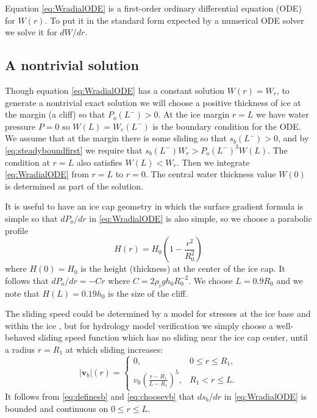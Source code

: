 \documentclass[gmd]{copernicus}   %
\newcommand\bv{\mathbf{v}}
\begin{document}
Equation \eqref{eq:WradialODE} is a first-order ordinary differential equation (ODE) for $W(r)$.  To put it in the standard form expected by a numerical ODE solver we solve it for $dW/dr$.

\subsection{A nontrivial solution}  \label{subsect:exactsoln}  Though equation \eqref{eq:WradialODE} has a constant solution $W(r)=W_r$, to generate a nontrivial exact solution we will choose a positive thickness of ice at the margin (a cliff) so that $P_o(L^-)>0$.  At the ice margin $r=L$ we have water pressure $P=0$ so $W(L)=W_c(L^-)$ is the boundary condition for the ODE.  We assume that at the margin there is some sliding so that $s_b(L^-)>0$, and by \eqref{eq:steadyboundfirst} we require that $s_b(L^-) W_r > P_o(L^-)^3 W(L)$.  The condition at $r=L$ also satisfies $W(L) < W_r$.  Then we integrate \eqref{eq:WradialODE} from $r=L$ to $r=0$.  The central water thickness value $W(0)$ is determined as part of the solution.

It is useful to have an ice cap geometry in which the surface gradient formula is simple so that $dP_o/dr$ in \eqref{eq:WradialODE} is also simple, so we choose a parabolic profile
\begin{equation}
H(r) = H_0 \left(1 - \frac{r^2}{R_0^2} \right) \label{eq:choosebodvardssonh}
\end{equation}
where $H(0)=H_0$ is the height (thickness) at the center of the ice cap.  It follows that $dP_o/dr = - C r$ where $C=2\rho_i g h_0 R_0^{-2}$.  We choose $L=0.9 R_0$ and we note that $H(L)=0.19 h_0$ is the size of the cliff.

The sliding speed could be determined by a model for stresses at the ice base and within the ice \citep{GreveBlatter2009}, but for hydrology model verification we simply choose a well-behaved sliding speed function which has no sliding near the ice cap center, until a radius $r=R_1$ at which sliding increases:
\begin{equation}
|\bv_b|(r) = \begin{cases} 0, & 0 \le r \le R_1, \\
                           v_0  \left(\frac{r-R_1}{L-R_1}\right)^5, & R_1 < r \le L.
             \end{cases}  \label{eq:choosevb}
\end{equation}
It follows from \eqref{eq:definesb} and \eqref{eq:choosevb} that $ds_b/dr$ in \eqref{eq:WradialODE} is bounded and continuous on $0\le r \le L$.
\end{document}
